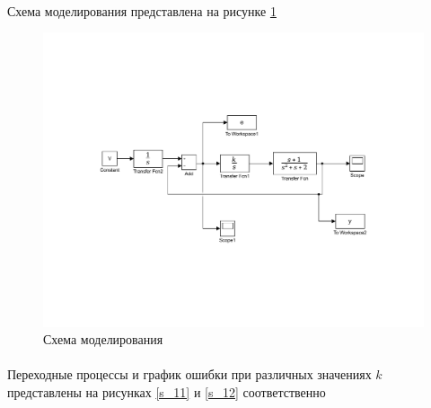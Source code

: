 \documentclass[a4paper,12pt]{article}
\begin{document}
	\paragraph {} Схема моделирования представлена на рисунке \ref{s_10}
	
	\begin{figure}[h]
		\renewcommand{\figurename}{Рисунок}
		\centering
		\includegraphics[width=6in]{Astatizm1VMOD.pdf}
		\caption{Схема моделирования}
		\label{s_10}
	\end{figure}
	\newpage 
	\paragraph {}Переходные процессы и график ошибки при различных значениях $k$ представлены на рисунках \ref{s_11} и \ref{s_12} соответственно
	
\end{document}
